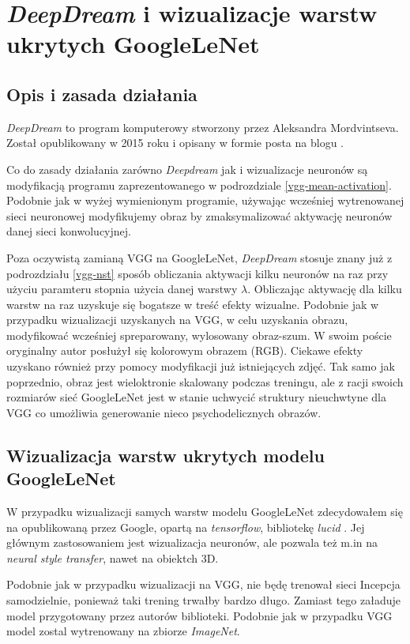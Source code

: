 \section{\textit{DeepDream} i wizualizacje warstw ukrytych GoogleLeNet}

\subsection{Opis i zasada działania}
\label{ddopis}
\textit{DeepDream} to  program komputerowy stworzony przez Aleksandra Mordvintseva. Został opublikowany  w 2015 roku i opisany w formie posta na blogu \cite{deepdream}.

Co do zasady działania zarówno \textit{Deepdream} jak i wizualizacje neuronów są modyfikacją programu zaprezentowanego w podrozdziale \ref{vgg-mean-activation}. Podobnie jak w wyżej wymienionym programie, używając wcześniej wytrenowanej sieci neuronowej modyfikujemy obraz by zmaksymalizować aktywację neuronów danej sieci konwolucyjnej.

Poza oczywistą zamianą VGG na GoogleLeNet, \textit{DeepDream} stosuje znany już z podrozdziału
\ref{vgg-nst} sposób obliczania aktywacji kilku neuronów na raz przy użyciu paramteru stopnia 
użycia danej warstwy \(\lambda\). Obliczając aktywację dla kilku warstw na raz uzyskuje się bogatsze w treść efekty wizualne. Podobnie jak w przypadku wizualizacji uzyskanych na VGG, w celu uzyskania obrazu,
modyfikować wcześniej spreparowany, wylosowany obraz-szum. W swoim poście oryginalny autor posłużył się kolorowym obrazem (RGB). Ciekawe efekty uzyskano również przy pomocy modyfikacji już istniejących zdjęć. Tak samo jak poprzednio, obraz jest wieloktronie skalowany podczas treningu, ale z racji swoich rozmiarów sieć GoogleLeNet jest w stanie uchwycić struktury nieuchwtyne dla VGG co umożliwia generowanie 
nieco psychodelicznych obrazów.

\subsection{Wizualizacja warstw ukrytych modelu GoogleLeNet}
W przypadku wizualizacji samych warstw modelu GoogleLeNet zdecydowałem się na  
opublikowaną przez Google, opartą na \textit{tensorflow}, bibliotekę \textit{lucid} \cite{lucidrepo}. Jej głównym zastosowaniem jest wizualizacja neuronów, ale pozwala też m.in na \textit{neural style transfer}, nawet na obiektch 3D.

Podobnie jak w przypadku wizualizacji na VGG, nie będę trenował sieci Incepcja samodzielnie, ponieważ taki trening trwałby bardzo długo. Zamiast tego załaduje model przygotowany przez autorów biblioteki. Podobnie jak w przypadku VGG model zostal wytrenowany na zbiorze \textit{ImageNet}.


